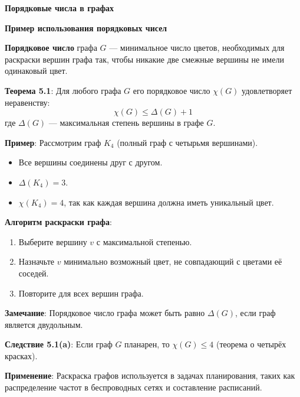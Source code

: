 \textbf{Порядковые числа в графах}

\noindent\textbf{Пример использования порядковых чисел}

\noindent\textbf{Порядковое число} графа $G$ — минимальное число цветов, необходимых для раскраски вершин графа так, чтобы никакие две смежные вершины не имели одинаковый цвет.

\noindent\textbf{Теорема 5.1}: Для любого графа $G$ его порядковое число $\chi(G)$ удовлетворяет неравенству:
\[
\chi(G) \leq \Delta(G) + 1
\]
где $\Delta(G)$ — максимальная степень вершины в графе $G$.

\noindent\textbf{Пример}: Рассмотрим граф $K_4$ (полный граф с четырьмя вершинами).
\begin{itemize}
    \item Все вершины соединены друг с другом.
    \item $\Delta(K_4) = 3$.
    \item $\chi(K_4) = 4$, так как каждая вершина должна иметь уникальный цвет.
\end{itemize}

\noindent\textbf{Алгоритм раскраски графа}:
\begin{enumerate}
    \item Выберите вершину $v$ с максимальной степенью.
    \item Назначьте $v$ минимально возможный цвет, не совпадающий с цветами её соседей.
    \item Повторите для всех вершин графа.
\end{enumerate}

\noindent\textbf{Замечание}: Порядковое число графа может быть равно $\Delta(G)$, если граф является двудольным.

\noindent\textbf{Следствие 5.1(a)}: Если граф $G$ планарен, то $\chi(G) \leq 4$ (теорема о четырёх красках).

\noindent\textbf{Применение}: Раскраска графов используется в задачах планирования, таких как распределение частот в беспроводных сетях и составление расписаний.